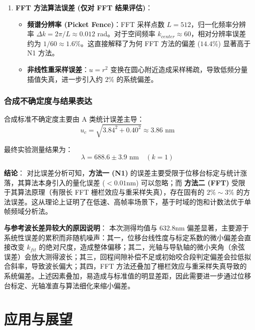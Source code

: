 \documentclass[twocolumn, a4paper, 10pt]{article}
\begin{document}
\begin{enumerate}
    \item \textbf{FFT 方法算法误差 (仅对 FFT 结果评估)}：
    \begin{itemize}
        \item \textbf{频谱分辨率 (Picket Fence)}：FFT 采样点数 $L=512$，归一化频率分辨率 $\Delta k = 2\pi/L \approx 0.012$ rad。对于空间频率 $k_{center} \approx 60$，相对分辨率误差约为 $1/60 \approx 1.6\%$。这直接解释了为何 FFT 方法的偏差 ($14.4\%$) 显著高于 N1 方法。
        \item \textbf{非线性重采样误差}：$u=r^2$ 变换在圆心附近造成采样稀疏，导致低频分量插值失真，进一步引入约 $2\%$ 的系统偏差。
    \end{itemize}
\end{enumerate}

\subsubsection{合成不确定度与结果表达}
合成标准不确定度主要由 A 类统计误差主导：
\begin{equation}
    u_c = \sqrt{3.84^2 + 0.40^2} \approx 3.86 \text{ nm}
\end{equation}

最终实验测量结果为：
\begin{equation}
    \lambda = 688.6 \pm 3.9 \text{ nm} \quad (k=1)
\end{equation}

\textbf{结论}：
对比误差分析可知，\textbf{方法一 (N1)} 的误差主要受限于位移台标定与统计涨落，其算法本身引入的量化误差 ($<0.01\text{nm}$) 可以忽略；而 \textbf{方法二 (FFT)} 受限于其算法原理（有限长 FFT 栅栏效应与重采样失真），存在固有的 $2\% \sim 3\%$ 的方法误差。这从理论上证明了在低速、高帧率场景下，基于时域的饱和计数法优于单帧频域分析法。

\textbf{与参考波长差异较大的原因说明}：
本次测得均值与 $632.8\text{nm}$ 偏差显著，主要源于\textsf{系统性误差的累积}而非随机噪声：其一，\textsf{位移台线性度与标定系数的微小偏差}会直接改变 $k_{fit}$ 的绝对尺度，造成整体偏移；其二，\textsf{光轴与导轨轴的微小夹角（余弦误差）}会放大测得波长；其三，\textsf{回程间隙补偿不足或初始咬合段判定偏差}会拉低拟合斜率，导致波长偏大；其四，FFT 方法还叠加了\textsf{栅栏效应与重采样失真}导致的系统偏差。上述因素叠加，易造成与标准值的明显差距，因此需要进一步通过位移台标定、光轴准直与算法细化来缩小偏差。

\section{应用与展望}
\end{document}
